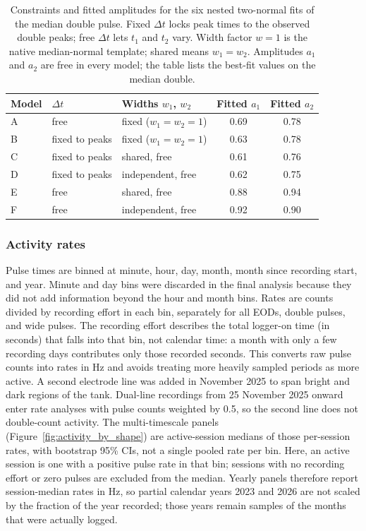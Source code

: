 \begin{table}[htbp]
  \centering
  \small
  \caption{Constraints and fitted amplitudes for the six nested two-normal fits of the median double pulse.
  Fixed $\Delta t$ locks peak times to the observed double peaks; free $\Delta t$ lets $t_1$ and $t_2$ vary.
  Width factor $w=1$ is the native median-normal template; shared means $w_1=w_2$.
  Amplitudes $a_1$ and $a_2$ are free in every model; the table lists the best-fit values on the median double.}
  \label{tab:double_pulse_models}
  \begin{tabular}{lllcc}
    \toprule
    \textbf{Model} & \textbf{$\Delta t$} & \textbf{Widths $w_1$, $w_2$} & \textbf{Fitted $a_1$} & \textbf{Fitted $a_2$} \\
    \midrule
    A & free & fixed ($w_1=w_2=1$) & 0.69 & 0.78 \\
    B & fixed to peaks & fixed ($w_1=w_2=1$) & 0.63 & 0.78 \\
    C & fixed to peaks & shared, free & 0.61 & 0.76 \\
    D & fixed to peaks & independent, free & 0.62 & 0.75 \\
    E & free & shared, free & 0.88 & 0.94 \\
    F & free & independent, free & 0.92 & 0.90 \\
    \bottomrule
  \end{tabular}
\end{table}

\subsubsection{Activity rates}

Pulse times are binned at minute, hour, day, month, month since recording start, and year.
Minute and day bins were discarded in the final analysis because they did not add information beyond the hour and month bins.
Rates are counts divided by recording effort in each bin, separately for all EODs, double pulses, and wide pulses.
The recording effort describes the total logger-on time (in seconds) that falls into that bin, not calendar time: a month with only a few recording days contributes only those recorded seconds.
This converts raw pulse counts into rates in Hz and avoids treating more heavily sampled periods as more active.
A second electrode line was added in November 2025 to span bright and dark regions of the tank.
Dual-line recordings from 25 November 2025 onward enter rate analyses with pulse counts weighted by 0.5, so the second line does not double-count activity.
The multi-timescale panels (Figure~\ref{fig:activity_by_shape}) are active-session medians of those per-session rates, with bootstrap 95\% CIs, not a single pooled rate per bin.
Here, an active session is one with a positive pulse rate in that bin; sessions with no recording effort or zero pulses are excluded from the median.
Yearly panels therefore report session-median rates in Hz, so partial calendar years 2023 and 2026 are not scaled by the fraction of the year recorded; those years remain samples of the months that were actually logged.


